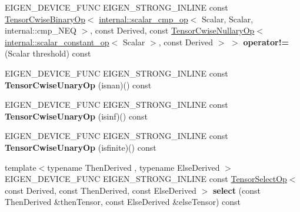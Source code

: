 \begin{DoxyCompactItemize}
E\+I\+G\+E\+N\+\_\+\+D\+E\+V\+I\+C\+E\+\_\+\+F\+U\+NC E\+I\+G\+E\+N\+\_\+\+S\+T\+R\+O\+N\+G\+\_\+\+I\+N\+L\+I\+NE const \hyperlink{class_eigen_1_1_tensor_cwise_binary_op}{Tensor\+Cwise\+Binary\+Op}$<$ \hyperlink{struct_eigen_1_1internal_1_1scalar__cmp__op}{internal\+::scalar\+\_\+cmp\+\_\+op}$<$ Scalar, Scalar, internal\+::cmp\+\_\+\+N\+EQ $>$, const Derived, const \hyperlink{class_eigen_1_1_tensor_cwise_nullary_op}{Tensor\+Cwise\+Nullary\+Op}$<$ \hyperlink{struct_eigen_1_1internal_1_1scalar__constant__op}{internal\+::scalar\+\_\+constant\+\_\+op}$<$ Scalar $>$, const Derived $>$ $>$ {\bfseries operator!=} (Scalar threshold) const
\item 
\mbox{\label{class_eigen_1_1_tensor_base_3_01_derived_00_01_read_only_accessors_01_4_a45e39410eeba84dbcd9300ca0e7d2a04}} 
E\+I\+G\+E\+N\+\_\+\+D\+E\+V\+I\+C\+E\+\_\+\+F\+U\+NC E\+I\+G\+E\+N\+\_\+\+S\+T\+R\+O\+N\+G\+\_\+\+I\+N\+L\+I\+NE const {\bfseries Tensor\+Cwise\+Unary\+Op} (isnan)() const
\item 
\mbox{\label{class_eigen_1_1_tensor_base_3_01_derived_00_01_read_only_accessors_01_4_aeea5062b9b3bdc17d422df3b97bcec6b}} 
E\+I\+G\+E\+N\+\_\+\+D\+E\+V\+I\+C\+E\+\_\+\+F\+U\+NC E\+I\+G\+E\+N\+\_\+\+S\+T\+R\+O\+N\+G\+\_\+\+I\+N\+L\+I\+NE const {\bfseries Tensor\+Cwise\+Unary\+Op} (isinf)() const
\item 
\mbox{\label{class_eigen_1_1_tensor_base_3_01_derived_00_01_read_only_accessors_01_4_ae1474aa2a0f6132ce782bf34fbe076d2}} 
E\+I\+G\+E\+N\+\_\+\+D\+E\+V\+I\+C\+E\+\_\+\+F\+U\+NC E\+I\+G\+E\+N\+\_\+\+S\+T\+R\+O\+N\+G\+\_\+\+I\+N\+L\+I\+NE const {\bfseries Tensor\+Cwise\+Unary\+Op} (isfinite)() const
\item 
\mbox{\label{class_eigen_1_1_tensor_base_3_01_derived_00_01_read_only_accessors_01_4_a2da4c3f143592e9ac2fb947a50aa3f9b}} 
{\footnotesize template$<$typename Then\+Derived , typename Else\+Derived $>$ }\\E\+I\+G\+E\+N\+\_\+\+D\+E\+V\+I\+C\+E\+\_\+\+F\+U\+NC E\+I\+G\+E\+N\+\_\+\+S\+T\+R\+O\+N\+G\+\_\+\+I\+N\+L\+I\+NE const \hyperlink{class_eigen_1_1_tensor_select_op}{Tensor\+Select\+Op}$<$ const Derived, const Then\+Derived, const Else\+Derived $>$ {\bfseries select} (const Then\+Derived \&then\+Tensor, const Else\+Derived \&else\+Tensor) const

\end{DoxyCompactItemize}
